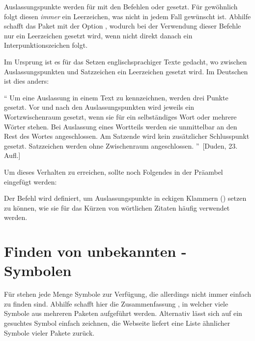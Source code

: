 %
Auslassungspunkte werden für  mit den Befehlen  
oder  gesetzt. Für gewöhnlich folgt diesen \emph{immer} ein 
Leerzeichen, was nicht in jedem Fall gewünscht ist. Abhilfe schafft das Paket 
 mit der Option , wodurch bei der Verwendung 
dieser Befehle nur ein Leerzeichen gesetzt wird, wenn nicht direkt danach ein 
Interpunktionszeichen folgt.
%
\begin{quoting}
\begin{Code}
\usepackage[xspace]{ellipsis}
\end{Code}
\end{quoting}
%
Im Ursprung ist es für das Setzen englischsprachiger Texte gedacht, wo zwischen 
Auslassungspunkten und Satzzeichen ein Leerzeichen gesetzt wird. Im Deutschen 
ist dies anders:
%
\begin{quoting}
\enquote{%
  Um eine Auslassung in einem Text zu kennzeichnen, werden drei Punkte gesetzt. 
  Vor und nach den Auslassungspunkten wird jeweils ein Wortzwischenraum 
  gesetzt, wenn sie für ein selbständiges Wort oder mehrere Wörter stehen. Bei 
  Auslassung eines Wortteils werden sie unmittelbar an den Rest des Wortes 
  angeschlossen. Am Satzende wird kein zusätzlicher Schlusspunkt gesetzt. 
  Satzzeichen werden ohne Zwischenraum angeschlossen.%
}~[Duden, 23. Aufl.]
\end{quoting} 
%
Um dieses Verhalten zu erreichen, sollte noch Folgendes in der Präambel 
eingefügt werden:
%
\begin{quoting}
\begin{Code}
\let\ellipsispunctuation\relax
\newcommand*{\qdots}{[\dots{}]\xspace}
\end{Code}
\end{quoting}
%
Der Befehl  wird definiert, um Auslassungspunkte in eckigen 
Klammern (\OPValue{\dots}) setzen zu können, wie sie für das Kürzen von 
wörtlichen Zitaten häufig verwendet werden.



\section{%
  Finden von unbekannten -Symbolen%
}

Für  stehen jede Menge Symbole zur Verfügung, die allerdings 
nicht immer einfach zu finden sind. Abhilfe schafft hier die Zusammenfassung 
, in 
welcher viele Symbole aus mehreren Paketen aufgeführt werden. Alternativ lässt 
sich auf  ein 
gesuchtes Symbol einfach zeichnen, die Webseite liefert eine Liste ähnlicher 
Symbole vieler Pakete zurück.



